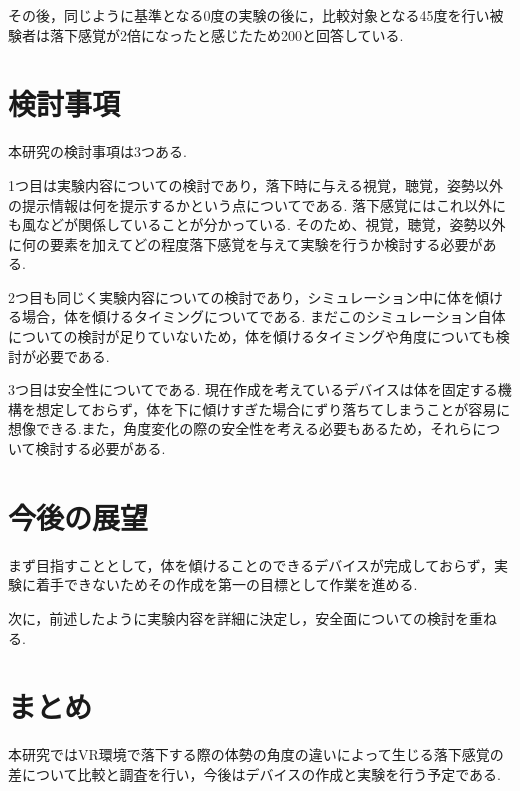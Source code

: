 \documentclass[uplatex]{jsarticle}
\begin{document}
その後，同じように基準となる0度の実験の後に，比較対象となる45度を行い被験者は落下感覚が2倍になったと感じたため200と回答している.

\section{検討事項}
本研究の検討事項は3つある.

1つ目は実験内容についての検討であり，落下時に与える視覚，聴覚，姿勢以外の提示情報は何を提示するかという点についてである.
落下感覚にはこれ以外にも風などが関係していることが分かっている\cite{青木誠也2018音と風によって浮遊感を感じさせる装置の制作}.
そのため、視覚，聴覚，姿勢以外に何の要素を加えてどの程度落下感覚を与えて実験を行うか検討する必要がある.

2つ目も同じく実験内容についての検討であり，シミュレーション中に体を傾ける場合，体を傾けるタイミングについてである.
まだこのシミュレーション自体についての検討が足りていないため，体を傾けるタイミングや角度についても検討が必要である.

3つ目は安全性についてである.
現在作成を考えているデバイスは体を固定する機構を想定しておらず，体を下に傾けすぎた場合にずり落ちてしまうことが容易に想像できる.また，角度変化の際の安全性を考える必要もあるため，それらについて検討する必要がある.

\section{今後の展望}
まず目指すこととして，体を傾けることのできるデバイスが完成しておらず，実験に着手できないためその作成を第一の目標として作業を進める.

次に，前述したように実験内容を詳細に決定し，安全面についての検討を重ねる.

\section{まとめ}
本研究ではVR環境で落下する際の体勢の角度の違いによって生じる落下感覚の差について比較と調査を行い，今後はデバイスの作成と実験を行う予定である.


 
\end{document}
